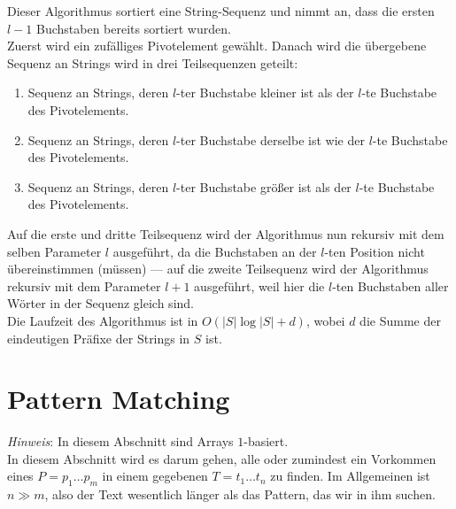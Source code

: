 Dieser Algorithmus sortiert eine String-Sequenz und nimmt an, dass die ersten \( l-1 \) Buchstaben bereits sortiert wurden. \\
Zuerst wird ein zufälliges Pivotelement gewählt. Danach wird die übergebene Sequenz an Strings wird in drei Teilsequenzen geteilt:
\begin{enumerate}
  \item Sequenz an Strings, deren \( l \)-ter Buchstabe kleiner ist als der \( l \)-te Buchstabe des Pivotelements.
  \item Sequenz an Strings, deren \( l \)-ter Buchstabe derselbe ist wie der \( l \)-te Buchstabe des Pivotelements.
  \item Sequenz an Strings, deren \( l \)-ter Buchstabe größer ist als der \( l \)-te Buchstabe des Pivotelements.
\end{enumerate}
Auf die erste und dritte Teilsequenz wird der Algorithmus nun rekursiv mit dem selben Parameter \( l \) ausgeführt, da die Buchstaben an der \( l \)-ten Position nicht übereinstimmen (müssen) --- auf die zweite Teilsequenz wird der Algorithmus rekursiv mit dem Parameter \( l+1 \) ausgeführt, weil hier die \( l \)-ten Buchstaben aller Wörter in der Sequenz gleich sind. \\
Die Laufzeit des Algorithmus ist in \( O(\left\vert S \right\vert \log \left\vert S \right\vert + d) \), wobei \( d \) die Summe der eindeutigen Präfixe der Strings in \( S \) ist.

\section{Pattern Matching}\label{sec:patternMatching}

\emph{Hinweis}: In diesem Abschnitt sind Arrays \( 1 \)-basiert. \\

In diesem Abschnitt wird es darum gehen, alle oder zumindest ein Vorkommen eines  \( P = p_1\dots p_m \) in einem gegebenen  \( T = t_1\dots t_n \) zu finden. Im Allgemeinen ist \( n \gg m \), also der Text wesentlich länger als das Pattern, das wir in ihm suchen. 

